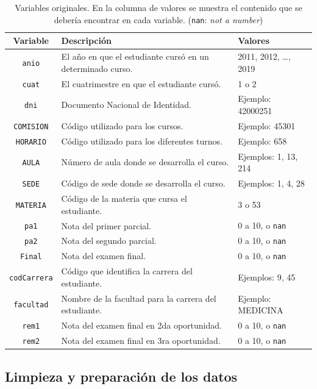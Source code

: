 \documentclass[a4paper,11pt,dvipsnames]{article}
\begin{document}
\begin{table}[!h]
    \caption{Variables originales. En la columna de valores se muestra el contenido que se debería encontrar en cada variable. (\texttt{nan}: \textit{not a number})}
    \begin{center}
    \begin{tabular}{cll}
    \hline
    \textbf{Variable} & \textbf{Descripción} & \textbf{Valores}\\
    \hline
    \texttt{anio} & El año en que el estudiante cursó en un determinado curso. & 2011, 2012, \dots, 2019\\
    \texttt{cuat} & El cuatrimestre en que el estudiante cursó. & 1 o 2\\
    \texttt{dni} & Documento Nacional de Identidad. & Ejemplo: 42000251\\
    \texttt{COMISION} & Código utilizado para los cursos. & Ejemplo: 45301\\
    \texttt{HORARIO} & Código utilizado para los diferentes turnos. & Ejemplo: 658\\
    \texttt{AULA} & Número de aula donde se desarrolla el curso. & Ejemplos: 1, 13, 214\\
    \texttt{SEDE} & Código de sede donde se desarrolla el curso. & Ejemplos: 1, 4, 28\\
    \texttt{MATERIA} & Código de la materia que cursa el estudiante. & 3 o 53\\
    \texttt{pa1} & Nota del primer parcial. & 0 a 10, o \texttt{nan}\\
    \texttt{pa2} & Nota del segundo parcial. & 0 a 10, o \texttt{nan}\\
    \texttt{Final} & Nota del examen final. & 0 a 10, o \texttt{nan}\\
    \texttt{codCarrera} & Código que identifica la carrera del estudiante. & Ejemplos: 9, 45\\
    \texttt{facultad} & Nombre de la facultad para la carrera del estudiante. & Ejemplo: MEDICINA\\
    \texttt{rem1} & Nota del examen final en 2da oportunidad. & 0 a 10, o \texttt{nan}\\
    \texttt{rem2} & Nota del examen final en 3ra oportunidad. & 0 a 10, o \texttt{nan}\\
    \hline
    \end{tabular}
    \label{tab:originales}
    \end{center}
\end{table}

\subsection{Limpieza y preparación de los datos}
\end{document}
